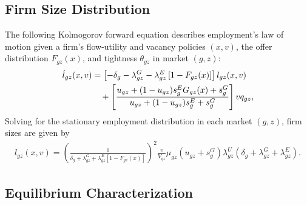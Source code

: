 \subsection{Firm Size Distribution}

The following Kolmogorov forward equation describes employment's law of motion given a firm's flow-utility and vacancy policies $(x, v)$, the offer distribution $F_{gz}(x)$, and tightness $\theta_{gz}$ in market $(g, z)$:
%
\begin{align}
    \dot{l}_{gz}(x, v) &= \left[ -\delta_{g} - \lambda_{gz}^{G} - \lambda_{gz}^{E} \left[1 - F_{gz}(x)\right] \right] l_{gz}(x, v) \notag \\
    &\quad + \left[ \frac{u_{gz} + (1 - u_{gz}) s_{g}^{E} G_{gz}(x) + s_{g}^{G}}{u_{gz} + (1 - u_{gz}) s_{g}^{E} + s_{g}^{G}} \right] v q_{gz},
\end{align}
%
Solving for the stationary employment distribution in each market $(g, z)$, firm sizes are given by
%
\begin{align}
    l_{gz}(x, v) = \left( \frac{1}{\delta_{g} + \lambda_{gz}^{G} + \lambda_{gz}^{E} \left[1 - F_{gz}(x)\right]} \right)^{2} \frac{v}{V_{gz}} \mu_{gz} (u_{gz} + s_{g}^{G}) \lambda_{gz}^{U} (\delta_{g} + \lambda_{gz}^{G} + \lambda_{gz}^{E}). \label{eq:size_stationary}
\end{align}
%


\subsection{Equilibrium Characterization}


